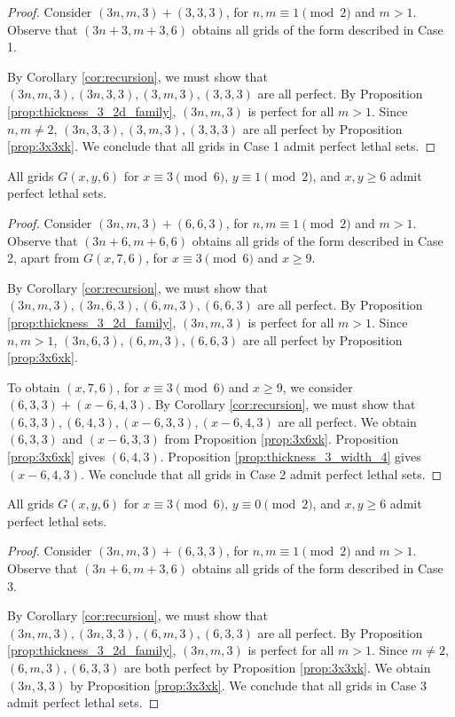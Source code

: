 \begin{proof}
Consider $(3n,m,3) + (3,3,3)$, for $n,m \equiv 1 \pmod 2$ and $m > 1$. Observe that $(3n+3, m+3,6)$ obtains all grids of the form described in Case 1.

By Corollary \ref{cor:recursion}, we must show that $(3n,m,3), (3n,3,3), (3,m,3),(3,3,3)$ are all perfect. By Proposition \ref{prop:thickness_3_2d_family}, $(3n,m,3)$ is perfect for all $m > 1$. Since $n,m \neq 2$, $(3n,3,3), (3,m,3),(3,3,3)$ are all perfect by Proposition \ref{prop:3x3xk}. We conclude that all grids in Case 1 admit perfect lethal sets.
\end{proof}

\begin{lem}
\label{lem:thickness_6_case_2}
All grids $G(x,y,6)$ for $x \equiv 3 \pmod 6$, $y \equiv 1 \pmod 2$, and $x,y \geq 6$ admit perfect lethal sets.
\end{lem}

\begin{proof}
Consider $(3n,m,3) + (6,6,3)$, for $n,m \equiv 1 \pmod 2$ and $m > 1$. Observe that $(3n+6,m+6,6)$ obtains all grids of the form described in Case 2, apart from $G(x,7,6)$, for $x \equiv 3 \pmod 6$ and $x \geq 9$. 

By Corollary \ref{cor:recursion}, we must show that $(3n,m,3), (3n,6,3), (6,m,3), (6,6,3)$ are all perfect. By Proposition \ref{prop:thickness_3_2d_family}, $(3n,m,3)$ is perfect for all $m > 1$. Since $n,m > 1$, $(3n,6,3), (6,m,3), (6,6,3)$ are all perfect by Proposition \ref{prop:3x6xk}.

To obtain $(x,7,6)$, for $x \equiv 3 \pmod 6$ and $x \geq 9$, we consider $(6,3,3) + (x-6, 4,3)$. By Corollary \ref{cor:recursion}, we must show that $(6,3,3), (6,4,3), (x-6,3,3), (x-6,4,3)$ are all perfect. We obtain $(6,3,3)$ and $(x-6,3,3)$ from Proposition \ref{prop:3x6xk}. Proposition \ref{prop:3x6xk} gives $(6,4,3)$. Proposition \ref{prop:thickness_3_width_4} gives $(x-6,4,3)$. We conclude that all grids in Case 2 admit perfect lethal sets. 
\end{proof}

\begin{lem}
\label{lem:thickness_6_case_3}
All grids $G(x,y,6)$ for $x \equiv 3 \pmod 6$, $y \equiv 0 \pmod 2$, and $x,y \geq 6$ admit perfect lethal sets.
\end{lem}

\begin{proof}
Consider $(3n,m,3) + (6,3,3)$, for $n,m \equiv 1 \pmod 2$ and $m > 1$. Observe that $(3n+6,m+3,6)$ obtains all grids of the form described in Case 3. 

By Corollary \ref{cor:recursion}, we must show that $(3n,m,3), (3n,3,3), (6,m,3), (6,3,3)$ are all perfect. By Proposition \ref{prop:thickness_3_2d_family}, $(3n,m,3)$ is perfect for all $m > 1$. Since $m \neq 2$, $(6,m,3),(6,3,3)$ are both perfect by Proposition \ref{prop:3x3xk}. We obtain $(3n,3,3)$ by Proposition \ref{prop:3x3xk}. We conclude that all grids in Case 3 admit perfect lethal sets.
\end{proof}

